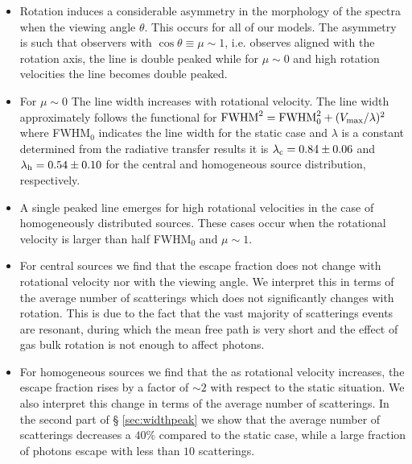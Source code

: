\documentclass{emulateapj}
\newcommand{\ly}{{\ifmmode{{\rm Ly}\alpha~}\else{Ly$\alpha$~}\fi}}
\begin{document}
\begin{itemize}

\item Rotation induces a considerable asymmetry in the morphology 
 of the spectra when the viewing angle $\theta$. This occurs for
 all of our models. The asymmetry is such that observers with
 $\cos\theta\equiv \mu\sim 1$, i.e. observes aligned with the rotation
 axis, the line is double peaked while for $\mu\sim 0$ and high
 rotation velocities the line becomes double peaked.

\item For $\mu \sim 0$ The line width increases with rotational velocity. The line width
  approximately follows the functional for  ${\rm FWHM}^2 = {\rm FWHM}_{
    0}^2 + (V_{\rm max}/\lambda)^2$ where FWHM$_{0}$ indicates the line
  width for the static case and $\lambda$ is a constant determined from
  the radiative transfer results it is $\lambda_{\rm c}=0.84 \pm 0.06$ and
  $\lambda_{\rm h}=0.54\pm 0.10$ for the central and homogeneous source
  distribution, respectively.

\item A single peaked line emerges for high rotational velocities in
  the case of homogeneously distributed sources. These cases occur when
  the rotational velocity is larger than half FWHM$_0$ and $\mu\sim 1$.  

\item 
For central sources we find that the escape fraction does not change
with rotational velocity nor with the viewing angle. We interpret this
in terms of the average number of scatterings which does not
significantly changes with rotation. This is due to the  
  fact that the vast majority of scatterings events are resonant, 
  during which the mean free path is very short and the effect of gas
  bulk rotation is not enough to affect \ly photons. 
  
\item For homogeneous sources we find that the  as rotational velocity
  increases, the escape fraction rises by a factor of $\sim 2$ with
  respect to the static situation. We also interpret this change in
  terms of the average number of scatterings. In the second part of \S
  \ref{sec:widthpeak} we show that the average number of scatterings
  decreases a $40\%$ compared to the static case, while a large
  fraction of photons escape with less than $10$ scatterings.  


\end{itemize}
\end{document}
